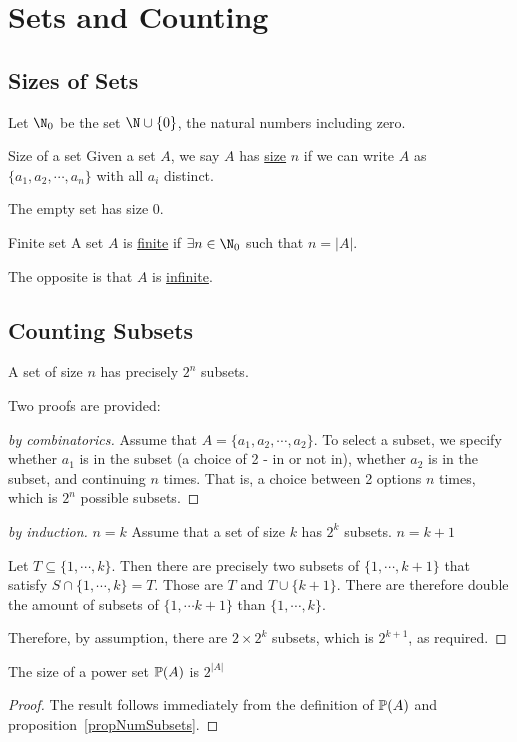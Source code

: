 \documentclass[../Main.tex]{subfiles}
\begin{document}
\section{Sets and Counting}
\subsection{Sizes of Sets}
Let $\N_0$ be the set $\N \cup \{0\}$, the natural numbers including zero.
\begin{definition}{Size of a set}
    Given a set $A$, we say $A$ has \underline{size} $n$ if we can write $A$ as $\{a_1, a_2, \cdots, a_n\}$ with all $a_i$ distinct.
\end{definition}
The empty set has size $0$.
\begin{definition}{Finite set}
    A set $A$ is \underline{finite} if $\exists n \in \N_0$ such that $n = |A|$.
\end{definition}
The opposite is that $A$ is \underline{infinite}.\par
\subsection{Counting Subsets}
\begin{proposition}
    A set of size $n$ has precisely $2^n$ subsets.
    \label{propNumSubsets}
\end{proposition}
Two proofs are provided:
\begin{proof}[by combinatorics]
    Assume that $A = \{a_1, a_2, \cdots, a_2\}$. To select a subset, we specify whether $a_1$ is in the subset (a choice of 2 - in or not in), whether $a_2$ is in the subset, and continuing $n$ times. That is, a choice between 2 options $n$ times, which is $2^n$ possible subsets.
\end{proof}
\begin{proof}[by induction]
    {$n=k$}{
        Assume that a set of size $k$ has $2^k$ subsets.
    }
    {$n = k + 1$}{
        Let $T \subseteq \{1, \cdots, k\}$. Then there are precisely two subsets of $\{1, \cdots, k + 1\}$ that satisfy $S \cap \{1, \cdots, k\} = T$. Those are $T$ and $T \cup \{k + 1\}$. There are therefore double the amount of subsets of $\{1, \cdots k+1\}$ than $\{1, \cdots, k\}$.\par
        Therefore, by assumption, there are $2 \times 2^k$ subsets, which is $2^{k+1}$, as required.
    }
\end{proof}
\begin{corollary}
    The size of a power set $\mathbb{P}(A)$ is $2^{|A|}$
    \label{corSizePowerSet}
\end{corollary}
\begin{proof}
    The result follows immediately from the definition of $\mathbb{P}(A)$ and proposition~\ref{propNumSubsets}.
\end{proof}
\end{document}
